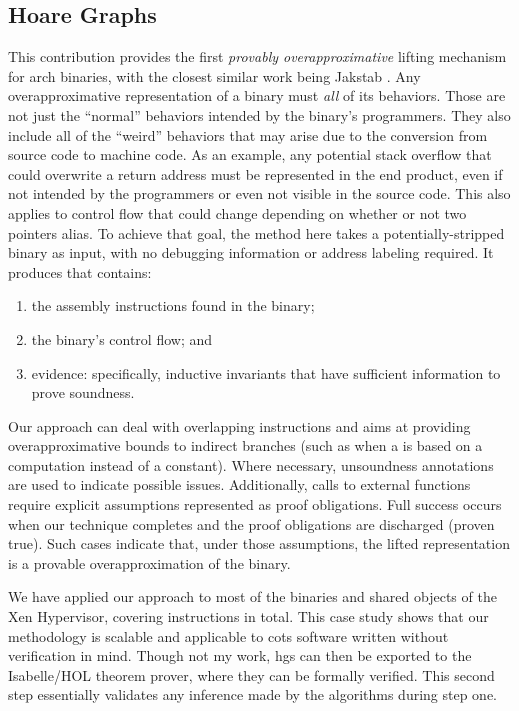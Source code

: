 \subsection{Hoare Graphs}
This contribution provides the first \emph{provably overapproximative} lifting mechanism for \gls{arch} binaries, with the closest similar work being Jakstab \autocite{kinder2010static,kinder2012alternating,kinder2012virtualization}.
Any overapproximative representation of a binary must \emph{all} of its behaviors.
Those are not just the ``normal'' behaviors intended by the binary's programmers.
They also include all of the ``weird'' behaviors that may arise due to the conversion from source code to machine code.
As an example, any potential stack overflow that could overwrite a return address must be represented in the end product, even if not intended by the programmers or even not visible in the source code.
This also applies to control flow that could change depending on whether or not two pointers alias.
To achieve that goal, the method here takes a potentially-stripped binary as input, with no debugging information or address labeling required.
It produces  that contains:
\begin{enumerate}
  \item the assembly instructions found in the binary;
  \item the binary's control flow; and
  \item evidence: specifically, inductive invariants that have sufficient information to prove soundness.
\end{enumerate}
Our approach can deal with overlapping instructions and aims at providing overapproximative bounds to indirect branches (such as when a  is based on a computation instead of a constant).
Where necessary, unsoundness annotations are used to indicate possible issues.
Additionally, calls to external functions require explicit assumptions represented as proof obligations.
Full success occurs when our technique completes and the proof obligations are discharged (proven true).
Such cases indicate that, under those assumptions, the lifted representation is a provable overapproximation of the binary.

We have applied our approach to most of the binaries and shared objects of the Xen Hypervisor, covering  instructions in total.
This case study shows that our methodology is scalable and applicable to \ac{cots} software written without verification in mind.
Though not my work, \acp{hg} can then be exported to the Isabelle/HOL theorem prover, where they can be formally verified.
This second step essentially validates any inference made by the algorithms during step one.

